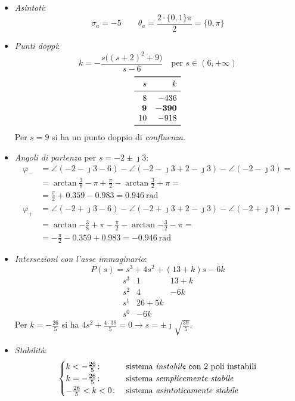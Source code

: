 \begin{esercizio}
\begin{itemize}
	\item \emph{Asintoti}:
		\[
			\sigma_a = -5 \qquad
			\theta_a = \frac{2\cdot\bigl\{0,1\bigr\}\pi}{2} = \bigl\{0,\pi\bigr\}
		\]
	\item \emph{Punti doppi}:
		\[
			k = -\frac{s\bigl((s+2)^2+9\bigr)}{s-6} \quad
			\text{per } s \in (6,+\infty)
		\]
		\[\begin{array}{rr}
			\toprule
			     s &         k \\
			\midrule
			     8 &      -436 \\
			\bm{9} & \bm{-390} \\
			    10 &      -918 \\
			\bottomrule
		\end{array}\]
		Per \(s=9\) si ha un punto doppio di \emph{confluenza}.
	\item \emph{Angoli di partenza} per \(s=-2\pm\jmath3\):
		\begin{align*}
			\varphi_- &= \angle(-2-\jmath3-6) -\angle(-2-\jmath3+2-\jmath3) -\angle(-2-\jmath3) = \\
				  &= \arctan{\frac{3}{8}} -\pi +\frac{\pi}{2} -\arctan{\frac{3}{2}} +\pi = \\
				  &= \frac{\pi}{2} +0.359 -0.983 = \SI{0.946}{\radian} \\
			\varphi_+ &= \angle(-2+\jmath3-6) -\angle(-2+\jmath3+2-\jmath3) -\angle(-2+\jmath3) = \\
				  &= \arctan{-\frac{3}{8}} +\pi -\frac{\pi}{2} -\arctan{-\frac{3}{2}} -\pi = \\
				  &= -\frac{\pi}{2} -0.359 +0.983 = \SI{-0.946}{\radian}
		\end{align*}
	\item \emph{Intersezioni con l'asse immaginario}:
		\[
			P(s) = s^3 +4s^2 +(13+k)s -6k
		\]
		\[\begin{array}{r|rr}
			s^3 & 1 & 13+k \\
			s^2 & 4 & -6k  \\
			s^1 & 26+5k    \\
			s^0 & -6k
		\end{array}\]
		Per \(k = -\frac{26}{5}\) si ha \(4s^2+\frac{4\cdot39}{5}=0 \rightarrow s=\pm\jmath\sqrt{\frac{39}{5}}\).
	\item \emph{Stabilità}:
		\[\begin{cases}
			k < -\frac{26}{5}\colon & \text{sistema \emph{instabile} con 2 poli instabili} \\
			k = -\frac{26}{5}\colon & \text{sistema \emph{semplicemente stabile}} \\
			-\frac{26}{5} < k < 0\colon & \text{sistema \emph{asintoticamente stabile}}
		\end{cases}\]
\end{itemize}
\end{esercizio}